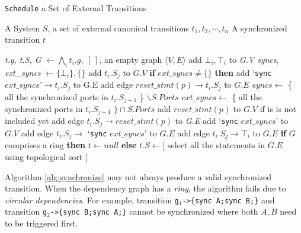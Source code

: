 \begin{algorithm}[t]
    \caption{\texttt{Schedule} a Set of External Transitions}
    \label{alg:synchronize}
    \small
    \begin{algorithmic}[1]
        \REQUIRE A System $S$, a set of external canonical transitions $t_1,t_2,\cdots,t_n$
        \ENSURE A synchronized transition $t$
        \STATE {}

        \STATE \emph{t.g, t.S, G} $\leftarrow \bigwedge_i t_i.g,\:[\:]$, an empty graph $\langle V,E\rangle$
            \STATE add $\bot_i, \top_i$ to \emph{G.V}
            \STATE \emph{syncs}, \emph{ext\_syncs} $\leftarrow\{\bot_i\},\{\}$
                \STATE add $t_i.S_{j}$ to $G.V$
                \STATE \textbf{if} $ext\_syncs\neq\{\}$ \textbf{then} add `\texttt{sync} $ext\_syncs\mbox{'}\rightarrow t_i.S_j$ to G.E 
                    \STATE add edge $reset\_stmt(p)\rightarrow t_i.S_j$ to $G.E$
                \ENDFOR
                \STATE $syncs\leftarrow$ \{ all the synchronized ports in $t_i.S_{j+1}$ \} $\backslash S.Ports$ \STATE $ext\_syncs\leftarrow$ \{ all the synchronized ports in $t_i.S_{j+1}$ $\}\cap S.Ports$
                        \STATE add $reset\_stmt(p)$ to $G.V$ if is is not included yet
                        \STATE add edge $t_i.S_j \rightarrow reset\_stmt(p)$ to \emph{G.E}
                    \ENDFOR
                        \STATE add `\texttt{sync} $ext\_syncs$' to $G.V$
                        \STATE add edge $t_i.S_j\rightarrow$ `\texttt{sync} $ext\_syncs$' to $G.E$
                    \ENDIF
                \ELSE
                    \STATE add edge $t_i.S_j\rightarrow \top_i$ to $G.E$
                \ENDIF
            \ENDFOR
        \ENDFOR
        \STATE \textbf{if} $G$ comprises a ring \textbf{then} $t\leftarrow null$
        \STATE \textbf{else} $t.S\leftarrow[$ select all the statements in $G.E$ using topological sort $]$
    \end{algorithmic}
\end{algorithm}

Algorithm \ref{alg:synchronize} may not always produce a valid synchronized transition. When the dependency graph has a \emph{ring}, the algorithm fails due to \emph{circular dependencies}.
For example, transition \texttt{g$_1$->\{sync A;sync B;\}} and transition \texttt{g$_2$->\{sync B;sync A;\}} cannot be synchronized where both $A,B$ need to be triggered first.

